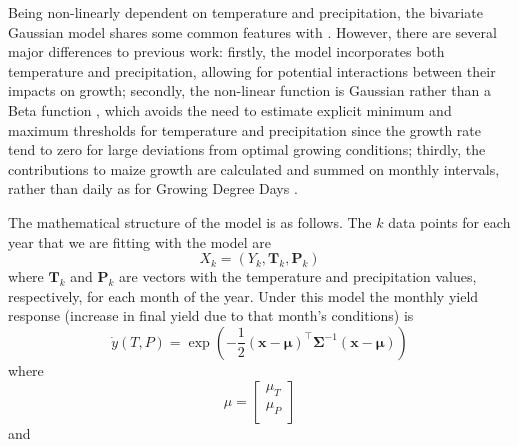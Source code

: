 \documentclass[12pt]{iopart}
\newcommand{\add}[1]{#1}
\begin{document}
\add{Being non-linearly dependent on temperature and precipitation, the bivariate Gaussian model shares some common features with \cite{cutforth:1990, streck:2007, yin:1995, zhou:2018}. However, there are several major differences to previous work: firstly, the model incorporates both temperature and precipitation, allowing for potential interactions between their impacts on growth; secondly, the non-linear function is Gaussian rather than a Beta function \citep[e.g.][]{yin:1995, streck:2007}, which avoids the need to estimate explicit minimum and maximum thresholds for temperature and precipitation since the growth rate tend to zero for large deviations from optimal growing conditions; thirdly, the contributions to maize growth are calculated and summed on monthly intervals, rather than daily as for Growing Degree Days \citep[e.g.][]{zhou:2018}.

The mathematical structure of the model is as follows.} The $k$ data points for each year that we are fitting with the model are 
\begin{equation}
X_k = (Y_k, \boldsymbol T_k, \boldsymbol P_k)
\end{equation}
where $\boldsymbol T_k$ and $\boldsymbol P_k$ are vectors with the temperature and precipitation values, respectively, for each month of the year. Under this model the monthly yield response (increase in final yield due to that month's conditions) is
\begin{equation}
\dot{y}(T,P) =  \exp\left(-\frac{1}{2} ({\mathbf x}-{\boldsymbol \mu})^\intercal {\boldsymbol \Sigma}^{-1}  ({\mathbf x}-{\boldsymbol \mu})\right)
\end{equation}
where
\begin{equation}
\mu =  \left[ {\begin{array}{c}
   \mu_T \\
   \mu_P \\
  \end{array} } \right]
\end{equation}
and
\end{document}
